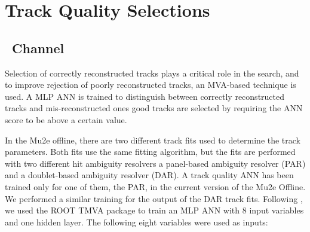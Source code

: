 

\section{Track Quality Selections}

\subsection{\MuToEm\  Channel}
\label{sec:mumem_channel}

Selection of correctly reconstructed tracks plays a critical role in the search, and 
to improve rejection of poorly reconstructed  tracks, an MVA-based technique is used.
A MLP ANN is trained to distinguish between correctly reconstructed tracks
and mis-reconstructed ones\strike{,}{\blue ;} good tracks are selected by requiring the ANN 
score to be above {\blue a} certain value.

In the Mu2e offline, 
{\blue there are two different track fits} used to determine the track parameters.
Both  {\blue fits use} the same fitting algorithm, but the fits are 
performed with two different hit ambiguity resolvers\strike{,}{\blue -} a panel-based ambiguity 
resolver {\blue (PAR)} and a doublet-based ambiguity resolver
{\blue (DAR)}. A track quality ANN has been trained only for one of them,
the PAR{\blue , in the current version of the Mu2e Offline}. 
%
We performed a similar training for the output of the DAR track fits.
%
Following \cite{MU2E_4595_ANN_TRAINING}, we used {\blue the} ROOT TMVA package to train a{\blue n}
MLP ANN with 8 input variables and one hidden layer. The following eight variables were used
as inputs:

